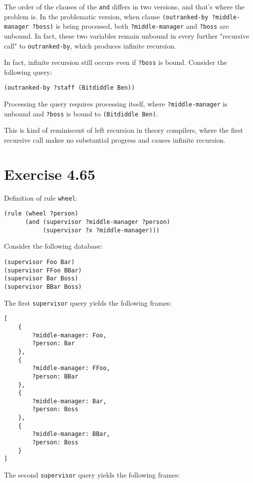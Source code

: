 \documentclass[../main.tex]{subfiles}
\begin{document}
The order of the clauses of the \lstinline{and} differs in two versions, and that's where the problem is. In the problematic version, when clause \lstinline{(outranked-by ?middle-manager ?boss)} is being processed, both \lstinline{?middle-manager} and \lstinline{?boss} are unbound. In fact, these two variables remain unbound in every further "recursive call" to \lstinline{outranked-by}, which produces infinite recursion.

In fact, infinite recursion still occurs even if \lstinline{?boss} is bound. Consider the following query:

\begin{lstlisting}
(outranked-by ?staff (Bitdiddle Ben))
\end{lstlisting}

Processing the query requires processing itself, where \lstinline{?middle-manager} is unbound and \lstinline{?boss} is bound to \lstinline{(Bitdiddle Ben)}.

This is kind of reminiscent of left recursion in theory compilers, where the first recursive call makes no substantial progress and causes infinite recursion.

\section{Exercise 4.65}

Definition of rule \lstinline{wheel}:

\begin{lstlisting}
(rule (wheel ?person)
      (and (supervisor ?middle-manager ?person)
           (supervisor ?x ?middle-manager)))
\end{lstlisting}

Consider the following database:

\begin{lstlisting}
(supervisor Foo Bar)
(supervisor FFoo BBar)
(supervisor Bar Boss)
(supervisor BBar Boss)
\end{lstlisting}

The first \lstinline{supervisor} query yields the following frames:

\begin{lstlisting}
[
	{
		?middle-manager: Foo,
		?person: Bar
	},
	{
		?middle-manager: FFoo,
		?person: BBar
	},
	{
		?middle-manager: Bar,
		?person: Boss
	},
	{
		?middle-manager: BBar,
		?person: Boss
	}
]
\end{lstlisting}

The second \lstinline{supervisor} query yields the following frames:
\end{document}

